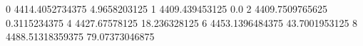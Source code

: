 0 4414.4052734375 4.9658203125
1 4409.439453125 0.0
2 4409.7509765625 0.3115234375
4 4427.67578125 18.236328125
6 4453.1396484375 43.7001953125
8 4488.51318359375 79.07373046875

